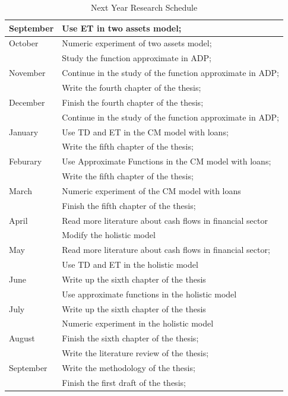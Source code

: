 \documentclass[12pt]{article}
\begin{document}
\begin{table}

\centering
\begin{tabular}{| l | l |}
\hline
\hline
September & Use ET in two assets model;\\
\hline
October & Numeric experiment of two assets model;\\
& Study the function approximate in ADP;\\
\hline
November & Continue in the study of the function approximate in ADP;\\

& Write the fourth chapter of the thesis;\\
\hline
December & Finish the fourth chapter of the thesis;\\
& Continue in the study of the function approximate in ADP;\\
\hline
January & Use TD and ET in the CM model with loans;\\
& Write the fifth chapter of the thesis;\\
\hline
Feburary & Use Approximate Functions in the CM model with loans;\\
& Write the fifth chapter of the thesis;\\
\hline
March & Numeric experiment of the CM model with loans\\
& Finish the fifth chapter of the thesis;\\
\hline
April & Read more literature about cash flows in financial sector\\
& Modify the holistic model\\
\hline
May & Read more literature about cash flows in financial sector;\\
& Use TD and ET in the holistic model\\
\hline
June & Write up the sixth chapter of the thesis\\
& Use approximate functions in the holistic model\\
\hline
July & Write up the sixth chapter of the thesis\\
& Numeric experiment in the holistic model\\
\hline
August & Finish the sixth chapter of the thesis;\\
& Write the literature review of the thesis;\\
\hline
September & Write the methodology of the thesis;\\
& Finish the first draft of the thesis;\\

\hline
\hline
\end{tabular}
\caption{Next Year Research Schedule}
\label{Plan}
\end{table}
\end{document}
